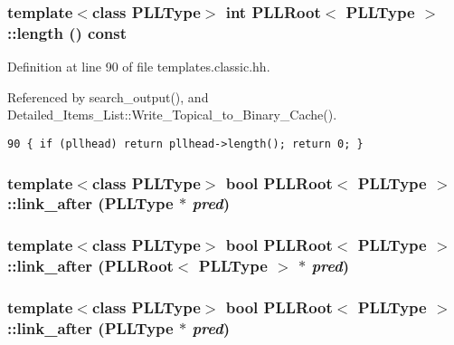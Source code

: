 \subsubsection{\setlength{\rightskip}{0pt plus 5cm}template$<$class PLLType$>$ int PLLRoot$<$ {\bf PLLType} $>$::length () const\hspace{0.3cm}{\tt  [inline]}}\label{classPLLRoot_a6}




Definition at line 90 of file templates.classic.hh.

Referenced by search\_\-output(), and Detailed\_\-Items\_\-List::Write\_\-Topical\_\-to\_\-Binary\_\-Cache().



\footnotesize\begin{verbatim}90 { if (pllhead) return pllhead->length(); return 0; } 
\end{verbatim}\normalsize 
{}
\subsubsection{\setlength{\rightskip}{0pt plus 5cm}template$<$class PLLType$>$ bool PLLRoot$<$ {\bf PLLType} $>$::link\_\-after ({\bf PLLType} $\ast$ {\em pred})\hspace{0.3cm}{\tt  [inline]}}\label{classPLLRoot_a62}


\subsubsection{\setlength{\rightskip}{0pt plus 5cm}template$<$class PLLType$>$ bool PLLRoot$<$ {\bf PLLType} $>$::link\_\-after (PLLRoot$<$ {\bf PLLType} $>$ $\ast$ {\em pred})\hspace{0.3cm}{\tt  [inline]}}\label{classPLLRoot_a61}


\subsubsection{\setlength{\rightskip}{0pt plus 5cm}template$<$class PLLType$>$ bool PLLRoot$<$ {\bf PLLType} $>$::link\_\-after ({\bf PLLType} $\ast$ {\em pred})\hspace{0.3cm}{\tt  [inline]}}\label{classPLLRoot_a45}


